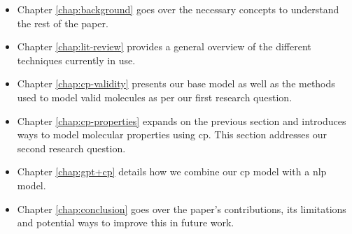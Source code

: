 \documentclass[../Document.tex]{subfiles}
\begin{document}
\begin{itemize}
    \item Chapter \ref{chap:background} goes over the necessary concepts to understand the rest of the paper.
    \item Chapter \ref{chap:lit-review} provides a general overview of the different techniques currently in use.
    \item Chapter \ref{chap:cp-validity} presents our base model as well as the methods used to model valid molecules as per our first research question.
    \item Chapter \ref{chap:cp-properties} expands on the previous section and introduces ways to model molecular properties using \acrshort{cp}. This section addresses our second research question.
    \item Chapter \ref{chap:gpt+cp} details how we combine our \acrshort{cp} model 
    with a \acrshort{nlp} model.
    \item Chapter \ref{chap:conclusion} goes over the paper's contributions, its limitations and potential ways to improve this in future work.
\end{itemize}
\end{document}
